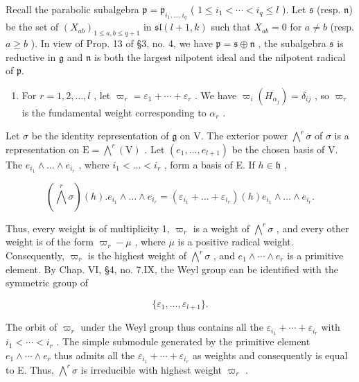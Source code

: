 Recall the parabolic subalgebra \(\mathfrak{p} = \mathfrak{p}_{i_1, \ldots, i_q}\) ( \(1 \leq i_1 < \cdots < i_q \leq l\) ). Let \(\mathfrak{s}\) (resp. \(\mathfrak{n}\)) be the set of \((X_{ab})_{1 \leq a, b \leq q+1}\) in \(\mathfrak{sl}(l+1, k)\) such that \(X_{ab} = 0\) for \(a \neq b\) (resp. \(a \geq b\) ). In view of Prop. 13 of §3, no. 4, we have \(\mathfrak{p} = \mathfrak{s} \oplus \mathfrak{n}\) , the subalgebra \(\mathfrak{s}\) is reductive in \(\mathfrak{g}\) and \(\mathfrak{n}\) is both the largest nilpotent ideal and the nilpotent radical of \(\mathfrak{p}\).

\begin{enumerate}
\def\labelenumi{(\Roman{enumi})}
\setcounter{enumi}{3}
\tightlist
\item
  For \(r = 1, 2, \ldots, l\) , let \(\varpi_{r} = \varepsilon_{1} + \cdots + \varepsilon_{r}\) . We have \(\varpi_{i}(H_{\alpha_{j}}) = \delta_{ij}\) , so \(\varpi_{r}\) is the fundamental weight corresponding to \(\alpha_{r}\) .
\end{enumerate}

Let \(\sigma\) be the identity representation of \(\mathfrak{g}\) on V. The exterior power \(\bigwedge^{r}\sigma\) of \(\sigma\) is a representation on \(\mathrm{E} = \bigwedge^{r}(\mathrm{V})\) . Let \((e_1,\ldots ,e_{l + 1})\) be the chosen basis of V. The \(e_{i_1}\wedge \dots \wedge e_{i_r}\) , where \(i_1 < \dots < i_r\) , form a basis of E. If \(h\in \mathfrak{h}\) ,

\[
(\bigwedge^ {r} \sigma) (h). e _ {i _ {1}} \wedge \dots \wedge e _ {i _ {r}} = (\varepsilon_ {i _ {1}} + \dots + \varepsilon_ {i _ {r}}) (h) e _ {i _ {1}} \wedge \dots \wedge e _ {i _ {r}}.
\]

Thus, every weight is of multiplicity 1, \(\varpi_{r}\) is a weight of \(\bigwedge^{r}\sigma\) , and every other weight is of the form \(\varpi_{r}-\mu\) , where \(\mu\) is a positive radical weight. Consequently, \(\varpi_{r}\) is the highest weight of \(\bigwedge^{r}\sigma\) , and \(e_{1}\wedge\cdots\wedge e_{r}\) is a primitive element. By Chap. VI, §4, no. 7.IX, the Weyl group can be identified with the symmetric group of

\[
\{\varepsilon_ {1}, \dots , \varepsilon_ {l + 1} \}.
\]

The orbit of \(\varpi_{r}\) under the Weyl group thus contains all the \(\varepsilon_{i_{1}} + \cdots + \varepsilon_{i_{r}}\) with \(i_{1} < \cdots < i_{r}\) . The simple submodule generated by the primitive element \(e_{1} \wedge \cdots \wedge e_{r}\) thus admits all the \(\varepsilon_{i_{1}} + \cdots + \varepsilon_{i_{r}}\) as weights and consequently is equal to E. Thus, \(\bigwedge^{r} \sigma\) is irreducible with highest weight \(\varpi_{r}\) .

